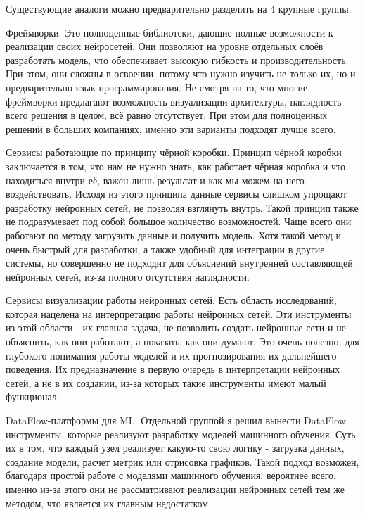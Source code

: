 \documentclass{report}
\begin{document}
Существующие аналоги можно предварительно разделить на 4 крупные группы.

\begin{enummarker}
\item Фреймворки. Это полноценные библиотеки, дающие полные возможности к реализации своих нейросетей. Они позволяют на уровне отдельных слоёв разработать модель, что обеспечивает высокую гибкость и производительность. При этом, они сложны в освоении, потому что нужно изучить не только их, но и предварительно язык программирования. Не смотря на то, что многие фреймворки предлагают возможность визуализации архитектуры, наглядность всего решения в целом, всё равно отсутствует. При этом для полноценных решений в больших компаниях, именно эти варианты подходят лучше всего.
\item Сервисы работающие по принципу чёрной коробки. Принцип чёрной коробки заключается в том, что нам не нужно знать, как работает чёрная коробка и что находиться внутри её, важен лишь результат и как мы можем на него воздействовать. Исходя из этого принципа данные сервисы слишком упрощают разработку нейронных сетей, не позволяя взглянуть внутрь. Такой принцип также не подразумевает под собой большое количество возможностей. Чаще всего они работают по методу загрузить данные и получить модель. Хотя такой метод и очень быстрый для разработки, а также удобный для интеграции в другие системы, но совершенно не подходит для объяснений внутренней составляющей нейронных сетей, из-за полного отсутствия наглядности.
\item Сервисы визуализации работы нейронных сетей. Есть область исследований, которая нацелена на интерпретацию работы нейронных сетей. Эти инструменты из этой области - их главная задача, не позволить создать нейронные сети и не объяснить, как они работают, а показать, как они думают. Это очень полезно, для глубокого понимания работы моделей и их прогнозирования их дальнейшего поведения. Их предназначение в первую очередь в интерпретации нейронных сетей, а не в их создании, из-за которых такие инструменты имеют малый функционал.
\item DataFlow-платформы для ML. Отдельной группой я решил вынести DataFlow инструменты, которые реализуют разработку моделей машинного обучения. Суть их в том, что каждый узел реализует какую-то свою логику - загрузка данных, создание модели, расчет метрик или отрисовка графиков. Такой подход возможен, благодаря простой работе с моделями машинного обучения, вероятнее всего, именно из-за этого они не рассматривают реализации нейронных сетей тем же методом, что является их главным недостатком.
\end{enummarker}
\end{document}
